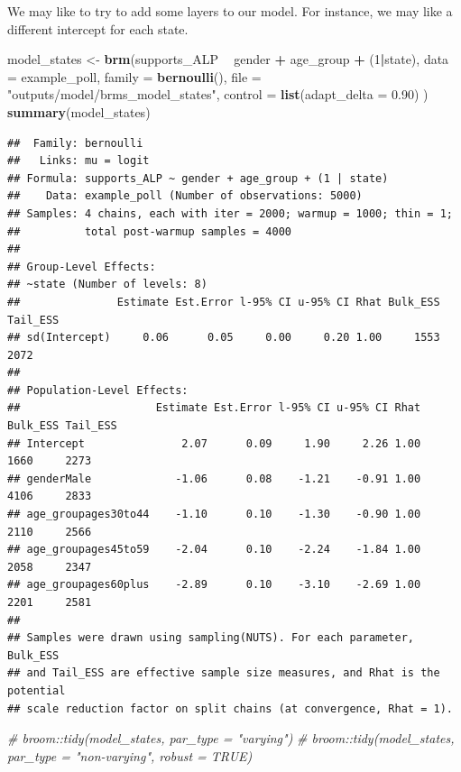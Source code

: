 \documentclass[
]{book}
\newenvironment{Shaded}{\begin{snugshade}}{\end{snugshade}}
\newcommand{\CommentTok}[1]{\textcolor[rgb]{0.56,0.35,0.01}{\textit{#1}}}
\newcommand{\DataTypeTok}[1]{\textcolor[rgb]{0.13,0.29,0.53}{#1}}
\newcommand{\DecValTok}[1]{\textcolor[rgb]{0.00,0.00,0.81}{#1}}
\newcommand{\FloatTok}[1]{\textcolor[rgb]{0.00,0.00,0.81}{#1}}
\newcommand{\KeywordTok}[1]{\textcolor[rgb]{0.13,0.29,0.53}{\textbf{#1}}}
\newcommand{\NormalTok}[1]{#1}
\newcommand{\OperatorTok}[1]{\textcolor[rgb]{0.81,0.36,0.00}{\textbf{#1}}}
\newcommand{\StringTok}[1]{\textcolor[rgb]{0.31,0.60,0.02}{#1}}
\begin{document}
We may like to try to add some layers to our model. For instance, we may like a different intercept for each state.

\begin{Shaded}
\begin{Highlighting}[]
\NormalTok{model_states <-}\StringTok{ }\KeywordTok{brm}\NormalTok{(supports_ALP }\OperatorTok{~}\StringTok{ }\NormalTok{gender }\OperatorTok{+}\StringTok{ }\NormalTok{age_group }\OperatorTok{+}\StringTok{ }\NormalTok{(}\DecValTok{1}\OperatorTok{|}\NormalTok{state), }
                    \DataTypeTok{data =}\NormalTok{ example_poll, }
                    \DataTypeTok{family =} \KeywordTok{bernoulli}\NormalTok{(),}
                    \DataTypeTok{file =} \StringTok{"outputs/model/brms_model_states"}\NormalTok{,}
                    \DataTypeTok{control =} \KeywordTok{list}\NormalTok{(}\DataTypeTok{adapt_delta =} \FloatTok{0.90}\NormalTok{)}
\NormalTok{                    )}
\KeywordTok{summary}\NormalTok{(model_states)}
\end{Highlighting}
\end{Shaded}

\begin{verbatim}
##  Family: bernoulli 
##   Links: mu = logit 
## Formula: supports_ALP ~ gender + age_group + (1 | state) 
##    Data: example_poll (Number of observations: 5000) 
## Samples: 4 chains, each with iter = 2000; warmup = 1000; thin = 1;
##          total post-warmup samples = 4000
## 
## Group-Level Effects: 
## ~state (Number of levels: 8) 
##               Estimate Est.Error l-95% CI u-95% CI Rhat Bulk_ESS Tail_ESS
## sd(Intercept)     0.06      0.05     0.00     0.20 1.00     1553     2072
## 
## Population-Level Effects: 
##                     Estimate Est.Error l-95% CI u-95% CI Rhat Bulk_ESS Tail_ESS
## Intercept               2.07      0.09     1.90     2.26 1.00     1660     2273
## genderMale             -1.06      0.08    -1.21    -0.91 1.00     4106     2833
## age_groupages30to44    -1.10      0.10    -1.30    -0.90 1.00     2110     2566
## age_groupages45to59    -2.04      0.10    -2.24    -1.84 1.00     2058     2347
## age_groupages60plus    -2.89      0.10    -3.10    -2.69 1.00     2201     2581
## 
## Samples were drawn using sampling(NUTS). For each parameter, Bulk_ESS
## and Tail_ESS are effective sample size measures, and Rhat is the potential
## scale reduction factor on split chains (at convergence, Rhat = 1).
\end{verbatim}

\begin{Shaded}
\begin{Highlighting}[]
\CommentTok{# broom::tidy(model_states, par_type = "varying")}
\CommentTok{# broom::tidy(model_states, par_type = "non-varying", robust = TRUE)}
\end{Highlighting}
\end{Shaded}
\end{document}
